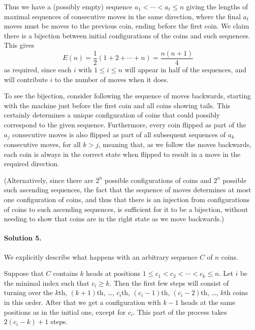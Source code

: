 Thus we have a (possibly empty) sequence \( a_1 < \cdots < a_t \leq n \) giving the lengths of maximal sequences of consecutive moves in the same direction, where the final \( a_t \) moves must be moves to the previous coin, ending before the first coin. We claim there is a bijection between initial configurations of the coins and such sequences. This gives
\[
E(n) = \frac{1}{2}(1 + 2 + \cdots + n) = \frac{n(n + 1)}{4}
\]
as required, since each \( i \) with \( 1 \leq i \leq n \) will appear in half of the sequences, and will contribute \( i \) to the number of moves when it does.

To see the bijection, consider following the sequence of moves backwards, starting with the machine just before the first coin and all coins showing tails. This certainly determines a unique configuration of coins that could possibly correspond to the given sequence. Furthermore, every coin flipped as part of the \( a_j \) consecutive moves is also flipped as part of all subsequent sequences of \( a_k \) consecutive moves, for all \( k > j \), meaning that, as we follow the moves backwards, each coin is always in the correct state when flipped to result in a move in the required direction.

(Alternatively, since there are \( 2^n \) possible configurations of coins and \( 2^n \) possible such ascending sequences, the fact that the sequence of moves determines at most one configuration of coins, and thus that there is an injection from configurations of coins to such ascending sequences, is sufficient for it to be a bijection, without needing to show that coins are in the right state as we move backwards.)

\paragraph{Solution 5.} We explicitly describe what happens with an arbitrary sequence \( C \) of \( n \) coins.

Suppose that \( C \) contains \( k \) heads at positions \( 1 \leq c_1 < c_2 < \cdots < c_k \leq n \). Let \( i \) be the minimal index such that \( c_i \geq k \). Then the first few steps will consist of turning over the \( k \)th, \( (k + 1) \)th, \ldots, \( c_i \)th, \( (c_i - 1) \)th, \( (c_i - 2) \)th, \ldots, \( k \)th coins in this order. After that we get a configuration with \( k - 1 \) heads at the same positions as in the initial one, except for \( c_i \). This part of the process takes \( 2(c_i - k) + 1 \) steps.

